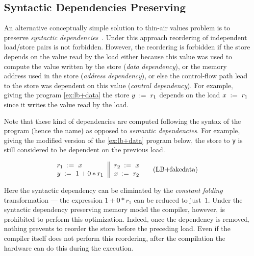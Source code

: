 
\subsection{Syntactic Dependencies Preserving}
\label{sec:analysis:deprf}

An alternative conceptually simple solution 
to thin-air values problem is to preserve 
\emph{syntactic dependencies}~\cite{Boehm-Demsky:MSPC14, Alglave-al:ASPLOS18}.
Under this approach reordering of independent load/store pairs is not forbidden.
However, the reordering is forbidden if the store depends on the value 
read by the load either because this value 
was used to compute the value written by the store (\emph{data dependency}), 
or the memory address used in the store (\emph{address dependency}),
or else the control-flow path lead to the store was dependent
on this value (\emph{control dependency}).
For example, giving the program \ref{ex:lb+data} 
the store $y\;:=_{}\;r_1$ depends 
on the load $x\;:=_{}\;r_1$ since 
it writes the value read by the load.

Note that these kind of dependencies are computed following the 
syntax of the program (hence the name) as opposed 
to \emph{semantic dependencies}.
For example, giving the modified version of the \ref{ex:lb+data} program below, 
the store to \texttt{y} is still considered to be dependent on the previous load. 

\begin{equation*}
\inarrII{
  \readInst{}{r_1}{x}           \\
  \writeInst{}{y}{1 + 0 * r_1}  \\
}{
  \readInst{}{r_2}{x}      \\
  \writeInst{}{x}{r_2}     \\
}
\tag{LB+fakedata}\label{ex:lb+fakedata}
\end{equation*}

Here the syntactic dependency can be eliminated 
by the \emph{constant folding} transformation --- 
the expression $1 + 0 * r_1$ can be reduced to just~$1$.
Under the syntactic dependency preserving memory model 
the compiler, however, is prohibited to perform this optimization. 
Indeed, once the dependency is removed, nothing prevents 
to reorder the store before the preceding load. 
Even if the compiler itself does not perform this reordering,
after the compilation the hardware can do this during the execution.   

